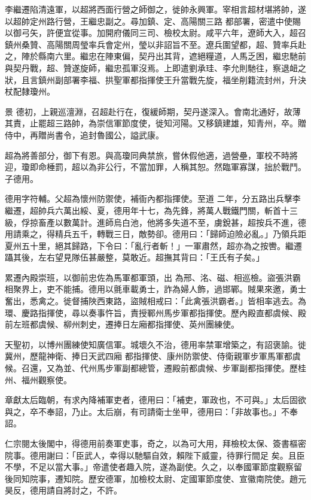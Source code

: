 \begin{pinyinscope}
 李繼遷陷清遠軍，以超將西面行營之師御之，徙帥永興軍。宰相言超材堪將帥，遂以超帥定州路行營，王繼忠副之。尋加鎮、定、高陽關三路
 都部署，密遣中使賜以御弓矢，許便宜從事。加開府儀同三司、檢校太尉。咸平六年，遼師大入，超召鎮州桑贊、高陽關周瑩率兵會定州，瑩以非詔旨不至。遼兵圍望都，超、贊率兵赴之，陣於縣南六里。繼忠在陣東偏，契丹出其背，遮絕糧道，人馬乏困，繼忠馳前與契丹戰，超、贊遂旋師，繼忠孤軍沒焉。上即遣劉承珪、李允則馳往，察退衄之狀，且言鎮州副部署李福、拱聖軍都指揮使王升當戰先旋，福坐削籍流封州，升決杖配隸瓊州。



 景
 德初，上親巡澶淵，召超赴行在，復緩師期，契丹遂深入。會南北通好，故薄其責，止罷超三路帥，為崇信軍節度使，徙知河陽。又移鎮建雄，知青州，卒。贈侍中，再贈尚書令，追封魯國公，謚武康。



 超為將善部分，御下有恩。與高瓊同典禁旅，嘗休假他適，過營壘，軍校不時將迎，瓊即命棰罰，超以為非公行，不當加罪，人稱其恕。然臨軍寡謀，拙於戰鬥。子德用。



 德用字符輔。父超為懷州防禦使，補衙內都指揮使。至道
 二年，分五路出兵擊李繼遷，超帥兵六萬出綏、夏，德用年十七，為先鋒，將萬人戰鐵門關，斬首十三級，俘掠畜產以數萬計。進師烏白池，他將多失道不至，虜銳甚，超按兵不進，德用請乘之，得精兵五千，轉戰三日，敵勢卻。德用曰：「歸師迫險必亂。」乃領兵距夏州五十里，絕其歸路，下令曰：「亂行者斬！」一軍肅然，超亦為之按轡。繼遷躡其後，左右望見隊伍甚嚴整，莫敢近。超撫其背曰：「王氏有子矣。」



 累遷內殿崇班，以御前忠佐為馬軍都軍頭，出
 為邢、洺、磁、相巡檢。盜張洪霸相聚界上，吏不能捕。德用以氈車載勇士，詐為婦人飾，過邯鄲。賊果來邀，勇士奮出，悉禽之。徙督捕陜西東路，盜賊相戒曰：「此禽張洪霸者。」皆相率逃去。為環、慶路指揮使，尋以奏事忤旨，責授鄆州馬步軍都指揮使。歷內殿直都虞候、殿前左班都虞候、柳州刺史，遷捧日左廂都指揮使、英州團練使。



 天聖初，以博州團練使知廣信軍。城壞久不治，德用率禁軍增築之，有詔褒諭。徙冀州，歷龍神衛、捧日天武四廂
 都指揮使、康州防禦使、侍衛親軍步軍馬軍都虞候。召還，又為並、代州馬步軍副都總管，遷殿前都虞候、步軍副都指揮使。歷桂州、福州觀察使。



 章獻太后臨朝，有求內降補軍吏者，德用曰：「補吏，軍政也，不可與。」太后固欲與之，卒不奉詔，乃止。太后崩，有司請衛士坐甲，德用曰：「非故事也。」不奉詔。



 仁宗閱太後閣中，得德用前奏軍吏事，奇之，以為可大用，拜檢校太保、簽書樞密院事。德用謝曰：「臣武人，幸得以馳驅自效，賴陛下威靈，待罪行間足
 矣。且臣不學，不足以當大事。」帝遣使者趣入院，遂為副使。久之，以奉國軍節度觀察留後同知院事，遷知院。歷安德軍，加檢校太尉、定國軍節度使、宣徽南院使。趙元昊反，德用請自將討之，不許。




\end{pinyinscope}
